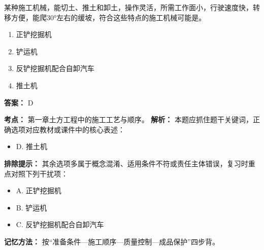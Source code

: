 \documentclass[UTF8,fontset=fandol,11pt]{ctexart}
\begin{document}
\vspace{0.2em}

\begin{quizbox}[title={第 4 题}]
某种施工机械，能切土、推土和卸土，操作灵活，所需工作面小，行驶速度快，转移方便，能爬30°左右的缓坡，符合这些特点的施工机械可能是。\\
\begin{enumerate}[label=\Alph*.]
\item 正铲挖掘机
\item 铲运机
\item 反铲挖掘机配合自卸汽车
\item 推土机
\end{enumerate}
\textbf{答案：} D
\vspace{0.25em}
\begin{answerbox}[title={考点解析}]
\textbf{考点：} 第一章土方工程中的施工工艺与顺序。
\textbf{解析：} 本题应抓住题干关键词，正确选项对应教材或课件中的核心表述：
\begin{itemize}
\item D. 推土机
\end{itemize}
\textbf{排除提示：} 其余选项多属于概念混淆、适用条件不符或责任主体错误，复习时重点对照下列干扰项：
\begin{itemize}
\item A. 正铲挖掘机
\item B. 铲运机
\item C. 反铲挖掘机配合自卸汽车
\end{itemize}
\textbf{记忆方法：} 按“准备条件—施工顺序—质量控制—成品保护”四步背。
\end{answerbox}
\end{quizbox}

\vspace{0.2em}
\end{document}
